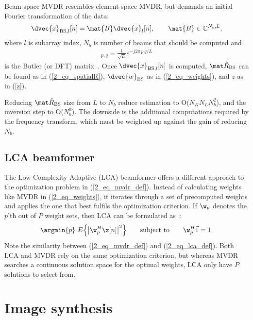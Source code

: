 {Beam-space MVDR resembles element-space MVDR, but demands an initial Fourier transformation of the data:
%
\begin{gather}
\dvec{x}_{\text{BS},l}[n] = \mat{B}\dvec{x}_l[n], \qquad \mat{B}\in \mathbb{C}^{N_b,L},\label{2_eq_beamspace}
\end{gather}
%
where $l$ is subarray index, $N_b$ is number of beams that should be computed and
%
\begin{gather}
[\mat{B}]_{p,q} = \frac{1}{\sqrt{L}} e^{-j2\pi\,p\,q/L}\label{2_eq_butler}
\end{gather}
%
is the Butler (or DFT) matrix~\cite{Butler1961}. Once $\dvec{x}_{\text{BS},l}[n]$ is computed, $\eR_\text{BS}$ can be found as in (\ref{2_eq_spatialR}), $\dvec{w}_\text{BS}$ as in (\ref{2_eq_weights}), and $z$ as in (\ref{z}).

Reducing $\eR_\text{BS}$ size from $L$ to $N_b$ reduce estimation to O($N_K N_L N_b^2$), and the inversion step to O($N_b^3$). The downside is the additional computations required by the frequency transform, which must be weighted up against the gain of reducing $N_b$.


\subsection{LCA beamformer}\label{sec_lca}

The Low Complexity Adaptive (LCA) beamformer offers a different approach to the optimization problem in (\ref{2_eq_mvdr_def}). Instead of calculating weights like MVDR in (\ref{2_eq_weights}), it iterates through a set of precomputed weights and applies the one that best fulfils the optimization criterion. If $\w_p$ denotes the $p$'th out of $P$ weight sets, then LCA can be formulated as~\cite{Synnevag2008}:
%
\begin{gather}
\argmin{p}\ E\Big\{\big|\w_p^H\x[n]\big|^2\Big\} \qquad\text{subject to}\qquad \w_p^H\1 = 1. \label{2_eq_lca_def}
\end{gather}
%
Note the similarity between (\ref{2_eq_mvdr_def}) and (\ref{2_eq_lca_def}). Both LCA and MVDR rely on the same optimization criterion, but whereas MVDR searches a continuous solution space for the optimal weights, LCA only have $P$ solutions to select from.


\section{Image synthesis}\label{sec_image_synthesis}

}
